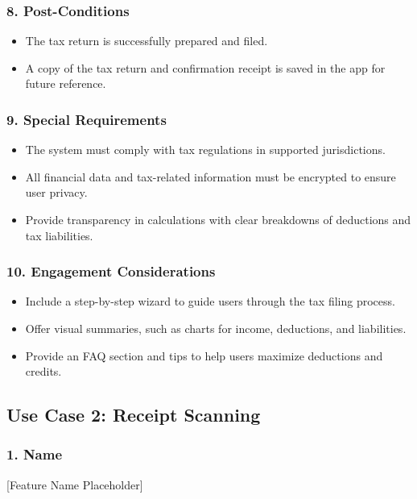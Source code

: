 \subsubsection*{8. Post-Conditions}
\begin{itemize}
    \item The tax return is successfully prepared and filed.
    \item A copy of the tax return and confirmation receipt is saved in the app for future reference.
\end{itemize}

\subsubsection*{9. Special Requirements}
\begin{itemize}
    \item The system must comply with tax regulations in supported jurisdictions.
    \item All financial data and tax-related information must be encrypted to ensure user privacy.
    \item Provide transparency in calculations with clear breakdowns of deductions and tax liabilities.
\end{itemize}

\subsubsection*{10. Engagement Considerations}
\begin{itemize}
    \item Include a step-by-step wizard to guide users through the tax filing process.
    \item Offer visual summaries, such as charts for income, deductions, and liabilities.
    \item Provide an FAQ section and tips to help users maximize deductions and credits.
\end{itemize}

\newpage


\subsection{Use Case 2: Receipt Scanning}

\subsubsection*{1. Name}
[Feature Name Placeholder]

